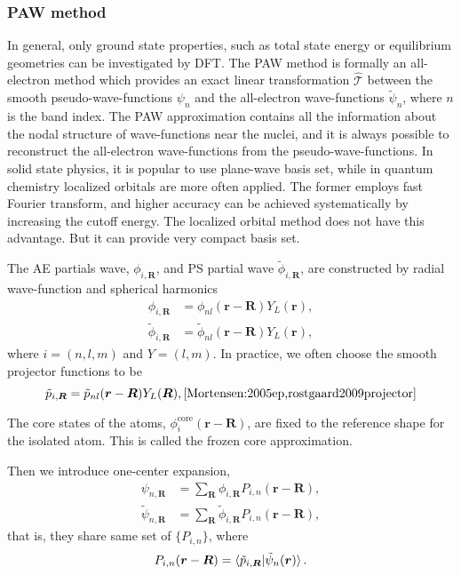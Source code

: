 
\subsubsection{PAW method}
\label{sssec:paw}

In general, only ground state properties, such as total state energy or
equilibrium geometries can be investigated by DFT.\cite{Enkovaara:2010jd}
The PAW method is formally an all-electron method which provides an exact linear
transformation
$\hat{\mathcal{T}}$
between the smooth pseudo-wave-functions $\psi_n$ and the
all-electron wave-functions $\tilde{\psi}_n$, where $n$ is the band index.
The PAW approximation contains all the information about the nodal structure of
wave-functions near the nuclei, and it is always possible to reconstruct the
all-electron wave-functions from the pseudo-wave-functions.
In solid state physics, it is popular to use plane-wave basis set, while in
quantum chemistry localized orbitals are more often applied.
The former employs fast Fourier transform, and higher accuracy can be achieved
systematically by increasing the cutoff energy. The localized orbital method does
not have this advantage. But it can provide very compact basis set.

The AE partials wave, $\phi_{i, \bm{R}}$, and PS partial wave $\tilde{\phi}_{i, \bm{R}}$,
are constructed by radial wave-function and spherical harmonics
\begin{align}
	\phi_{i, \bm{R}}         & = \phi_{nl} (\bm{r} - \bm{R}) Y_L(\bm{r}),         \\
	\tilde{\phi}_{i, \bm{R}} & = \tilde{\phi}_{nl} (\bm{r} - \bm{R}) Y_L(\bm{r}),
\end{align}
where $i = (n, l, m)$ and $Y = (l, m)$.\cite{Mortensen:2005ep}
In practice, we often choose the smooth projector functions to be
\begin{equation}
	\tilde{p}_{i, \bm{R}} = \tilde{p}_{nl} (\bm{r} - \bm{R}) Y_L (\bm{R}),
	\cite{Mortensen:2005ep,rostgaard2009projector}
\end{equation}

The core states of the atoms, $\phi_{i}^\text{core}(\bm{r} - \bm{R})$,
are fixed to the reference shape for the isolated atom. This is called the
frozen core approximation.\cite{rostgaard2009projector}


Then we introduce one-center expansion,
\begin{align}
	\psi_{n, \bm{R}}         & = \sum_{\bm{R}} \phi_{i, \bm{R}} P_{i, n} (\bm{r} - \bm{R}), \\
	\tilde{\psi}_{n, \bm{R}} & =
	\sum_{\bm{R}} \tilde{\phi} _{i, \bm{R}} P_{i, n} (\bm{r} - \bm{R}),
\end{align}
that is, they share same set of $\{ P_{i, n} \}$, where
\begin{equation}
	P_{i, n} (\bm{r} - \bm{R}) = \braket{ \tilde{p}_{i, \bm{R}} | \tilde{\psi}_n (\bm{r}) }.
\end{equation}


